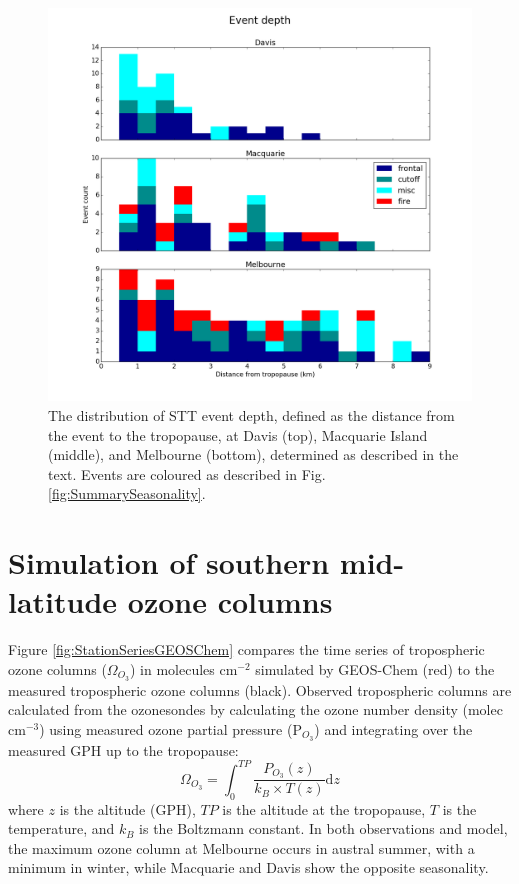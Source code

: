   \begin{figure}[t]
    
    \includegraphics[width=12cm]{figures/summary_depth.png}
    \caption{The distribution of STT event depth, defined as the distance from the event to the tropopause, at Davis (top), Macquarie Island (middle), and Melbourne (bottom), determined as described in the text.
    Events are coloured as described in Fig. \ref{fig:SummarySeasonality}.}
    \label{fig:SummaryTPDepths}
    
  \end{figure}

\section{Simulation of southern mid-latitude ozone columns}
  
  Figure \ref{fig:StationSeriesGEOSChem} compares the time series of tropospheric ozone columns ($\Omega_{O_3}$) in molecules cm$^{-2}$ simulated by GEOS-Chem (red) to the measured tropospheric ozone columns (black).
  Observed tropospheric columns are calculated from the ozonesondes by calculating the ozone number density (molec cm$^{-3}$) using measured ozone partial pressure (P$_{O_3}$) and integrating over the measured GPH up to the tropopause:
  \begin{equation}
    \Omega_{O_3} = \int_{0}^{TP} \frac{P_{O_3}(z)}{k_B \times T(z)} \mathrm{d}z
  \end{equation}
  where $z$ is the altitude (GPH), $TP$ is the altitude at the tropopause, $T$ is the temperature, and $k_B$ is the Boltzmann constant.
  In both observations and model, the maximum ozone column at Melbourne occurs in austral summer, with a minimum in winter, while Macquarie and Davis show the opposite seasonality.
  
